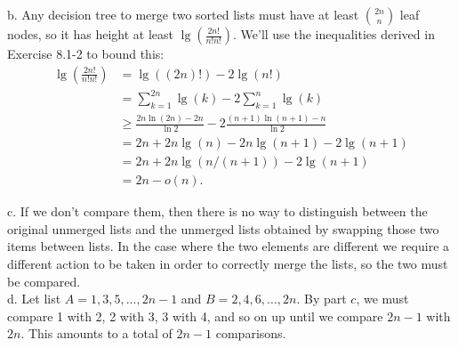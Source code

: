 \documentclass{article}
\begin{document}
b. Any decision tree to merge two sorted lists must have at least ${2n \choose n}$ leaf nodes, so it has height at least $\lg\left(\frac{2n!}{n!n!}\right)$.  We'll use the inequalities derived in Exercise 8.1-2 to bound this:
\begin{align*}
\lg\left(\frac{2n!}{n!n!}\right) &= \lg((2n)!) - 2\lg(n!) \\
&= \sum_{k=1}^{2n} \lg(k) - 2\sum_{k=1}^n \lg(k) \\
& \geq \frac{2n \ln(2n) - 2n}{\ln 2} - 2\frac{(n+1)\ln(n+1) - n}{\ln 2} \\
&= 2n + 2n\lg(n) - 2n\lg(n+1) - 2\lg(n+1) \\
&= 2n + 2n\lg(n/(n+1)) - 2\lg(n+1) \\
&= 2n - o(n).
\end{align*}

c. If we don't compare them, then there is no way to distinguish between the original unmerged lists and the unmerged lists obtained by swapping those two items between lists.  In the case where the two elements are different we require a different action to be taken in order to correctly merge the lists, so the two must be compared.\\

d. Let list $A = 1, 3, 5, ..., 2n-1$ and $B = 2, 4, 6, \ldots, 2n$. By part $c$, we must compare 1 with 2, 2 with 3, 3 with 4, and so on up until we compare $2n-1$ with $2n$. This amounts to a total of $2n-1$ comparisons. \\
\end{document}
